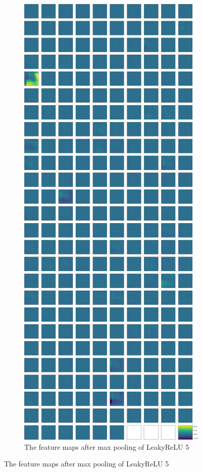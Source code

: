 \documentclass{beamer}
\begin{document}
\begin{frame}
\begin{figure}
\begin{subfigure}{0.3\textwidth}
\centering
\includegraphics[width=.8\textwidth]{images/stripes/max_pooling2d_3.png}
\caption{The feature maps after max pooling of LeakyReLU 5}
\label{subfig:maxpool}
\end{subfigure}
\end{figure}
\end{frame}
\end{document}
